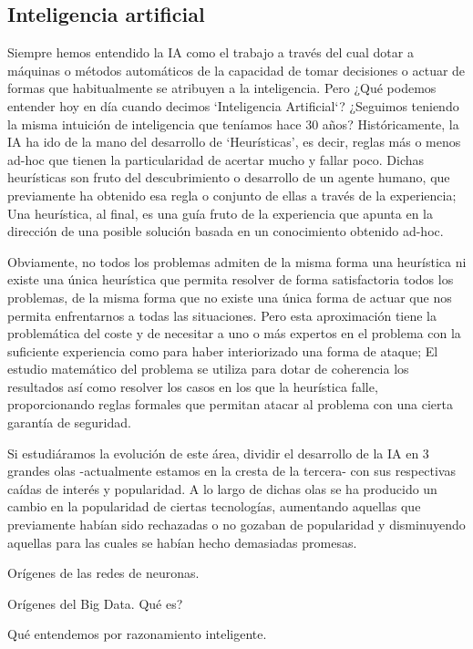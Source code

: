 \subsection{Inteligencia artificial}
Siempre hemos entendido la IA como el trabajo a través del cual dotar a máquinas
o métodos automáticos de la capacidad de tomar decisiones o actuar de formas que
habitualmente se atribuyen a la inteligencia.
Pero ¿Qué podemos entender hoy en día cuando decimos `Inteligencia Artificial`?
¿Seguimos teniendo la misma intuición de inteligencia que teníamos hace 30 años?
Históricamente, la IA ha ido de la mano del desarrollo de `Heurísticas', es
decir, reglas más o menos ad-hoc que tienen la particularidad de acertar mucho y
fallar poco. Dichas heurísticas son fruto del descubrimiento o desarrollo de un
agente humano, que previamente ha obtenido esa regla o conjunto de ellas a
través de la experiencia; Una heurística, al final, es una guía fruto de la
experiencia que apunta en la dirección de una posible solución basada en un
conocimiento obtenido ad-hoc.

Obviamente, no todos los problemas admiten de la misma forma una heurística ni
existe una única heurística que permita resolver de forma satisfactoria todos
los problemas, de la misma forma que no existe una única forma de actuar que
nos permita enfrentarnos a todas las situaciones. Pero esta aproximación tiene
la problemática del coste y de necesitar a uno o más expertos en el problema con
la suficiente experiencia como para haber interiorizado una forma de ataque;
El estudio matemático del problema se utiliza para dotar de coherencia
los resultados así como resolver los casos en los que la heurística falle,
proporcionando reglas formales que permitan atacar al problema con una cierta
garantía de seguridad.

Si estudiáramos la evolución de este área, dividir el desarrollo de la IA en 3
grandes olas -actualmente estamos en la cresta de la tercera- con sus
respectivas caídas de interés y popularidad. A lo largo de dichas olas se ha
producido un cambio en la popularidad de ciertas tecnologías, aumentando
aquellas que previamente habían sido rechazadas o no gozaban de popularidad y
disminuyendo aquellas para las cuales se habían hecho demasiadas promesas.



Orígenes de las redes de neuronas.

Orígenes del Big Data. Qué es?

Qué entendemos por razonamiento inteligente.

